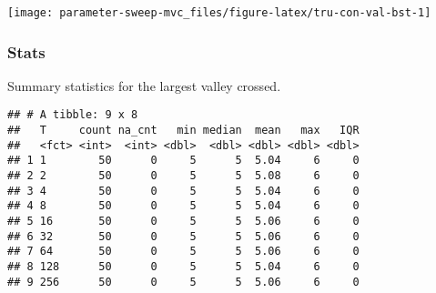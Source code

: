 \documentclass[]{book}
\newenvironment{Shaded}{\begin{snugshade}}{\end{snugshade}}
\newcommand{\DataTypeTok}[1]{\textcolor[rgb]{0.13,0.29,0.53}{#1}}
\newcommand{\KeywordTok}[1]{\textcolor[rgb]{0.13,0.29,0.53}{\textbf{#1}}}
\newcommand{\NormalTok}[1]{#1}
\newcommand{\OperatorTok}[1]{\textcolor[rgb]{0.81,0.36,0.00}{\textbf{#1}}}
\newcommand{\OtherTok}[1]{\textcolor[rgb]{0.56,0.35,0.01}{#1}}
\newcommand{\StringTok}[1]{\textcolor[rgb]{0.31,0.60,0.02}{#1}}
\begin{document}
\texttt{[image: parameter-sweep-mvc\_files/figure-latex/tru-con-val-bst-1]}

\hypertarget{stats-6}{%
\subsubsection{Stats}\label{stats-6}}

Summary statistics for the largest valley crossed.

\begin{Shaded}
\end{Shaded}

\begin{verbatim}
## # A tibble: 9 x 8
##   T     count na_cnt   min median  mean   max   IQR
##   <fct> <int>  <int> <dbl>  <dbl> <dbl> <dbl> <dbl>
## 1 1        50      0     5      5  5.04     6     0
## 2 2        50      0     5      5  5.08     6     0
## 3 4        50      0     5      5  5.04     6     0
## 4 8        50      0     5      5  5.04     6     0
## 5 16       50      0     5      5  5.06     6     0
## 6 32       50      0     5      5  5.06     6     0
## 7 64       50      0     5      5  5.06     6     0
## 8 128      50      0     5      5  5.04     6     0
## 9 256      50      0     5      5  5.06     6     0
\end{verbatim}
\end{document}
